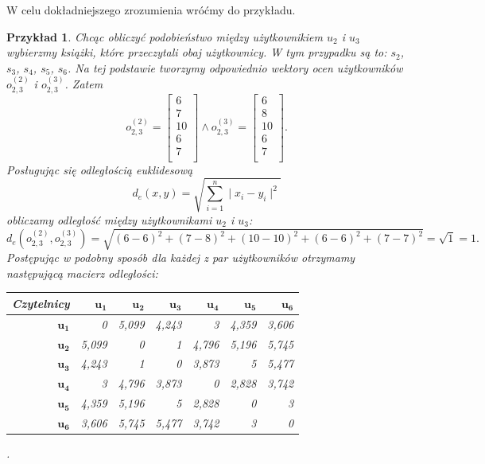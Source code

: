 \documentclass[12pt,a4paper]{report}
\newtheorem{przyklad}{Przykład}[chapter]
\begin{document}
W celu dokładniejszego zrozumienia wróćmy do przykładu.
\begin{przyklad}
Chcąc obliczyć podobieństwo między użytkownikiem $u_2$ i $u_3$ wybierzmy książki, które przeczytali obaj użytkownicy. W tym przypadku są to: $s_2$, $s_3$, $s_4$, $s_5$, $s_6$. Na tej podstawie tworzymy odpowiednio wektory ocen użytkowników $o_{2,3} ^{(2)}$ i $o_{2,3}^{(3)}$. 
Zatem
$$
o_{2,3} ^{(2)}= \left[
        \begin{array}{c}
         6 \\
         7 \\
         10 \\
         6 \\
         7 \\
         \end{array}
      \right] \wedge o_{2,3}^{(3)} = \left[
        \begin{array}{c}
         6 \\
         8 \\
         10 \\
         6 \\
         7 \\
         \end{array}
      \right].
$$
Posługując się odległością euklidesową
$$
d_{e}(x,y) = \sqrt{\sum_{i=1}^n \mid x_{i} - y_{i} \mid ^2 }
$$
obliczamy odległość między użytkownikami $u_2$ i $u_3$: 
$$
d_{e}(o_{2,3}^{(2)},o_{2,3}^{(3)}) = \sqrt{(6-6)^2 + (7-8)^2 + (10-10)^2 + (6-6)^2 + (7-7)^2} = \sqrt{1} = 1.
$$
Postępując w podobny sposób dla każdej z par użytkowników otrzymamy następującą macierz odległości:
\begin{center}
\begin{tabular}{|r|r|r|r|r|r|r|} \hline
\textbf{Czytelnicy} & $\mathbf{u_1}$ & $\mathbf{u_2}$ & $\mathbf{u_3}$ & $\mathbf{u_4}$ & $\mathbf{u_5}$ & $\mathbf{u_6}$ \\
\hline
$\mathbf{u_1}$ & 0 & 5,099 & 4,243 & 3 & 4,359 & 3,606 \\
\hline
$\mathbf{u_2}$ & 5,099 & 0 & 1 & 4,796 & 5,196 & 5,745 \\
\hline
$\mathbf{u_3}$ & 4,243 & 1 & 0 & 3,873 & 5 & 5,477 \\
\hline
$\mathbf{u_4}$ & 3 & 4,796 & 3,873 & 0 & 2,828 & 3,742  \\
\hline 
$\mathbf{u_5}$ & 4,359 & 5,196 & 5 & 2,828 & 0 & 3 \\
\hline 
$\mathbf{u_6}$ & 3,606 & 5,745 & 5,477 & 3,742 & 3 & 0  \\
\hline 
\end{tabular}.

\end{center}
\end{przyklad}
\end{document}
